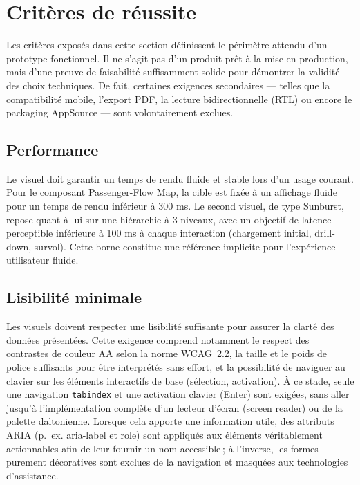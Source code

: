 \section{Critères de réussite}
\label{sec:success-criteria}

Les critères exposés dans cette section définissent le périmètre attendu d’un prototype fonctionnel. Il ne s’agit pas d’un produit prêt à la mise en production, mais d’une preuve de faisabilité suffisamment solide pour démontrer la validité des choix techniques. De fait, certaines exigences secondaires — telles que la compatibilité mobile, l’export PDF, la lecture bidirectionnelle (RTL) ou encore le packaging AppSource — sont volontairement exclues.

\subsection{Performance}  
Le visuel doit garantir un temps de rendu fluide et stable lors d’un usage courant. Pour le composant Passenger-Flow Map, la cible est fixée à un affichage fluide pour un temps de rendu inférieur à 300 ms. Le second visuel, de type Sunburst, repose quant à lui sur une hiérarchie à 3 niveaux, avec un objectif de latence perceptible inférieure à 100 ms à chaque interaction (chargement initial, drill-down, survol). Cette borne constitue une référence implicite pour l’expérience utilisateur fluide.

\subsection{Lisibilité minimale}  
Les visuels doivent respecter une lisibilité suffisante pour assurer la clarté des données présentées. Cette exigence comprend notamment le respect des contrastes de couleur AA selon la norme WCAG~2.2, la taille et le poids de police suffisants pour être interprétés sans effort, et la possibilité de naviguer au clavier sur les éléments interactifs de base (sélection, activation). À ce stade, seule une navigation \texttt{tabindex} et une activation clavier (Enter) sont exigées, sans aller jusqu’à l’implémentation complète d’un lecteur d’écran (screen reader) ou de la palette daltonienne. Lorsque cela apporte une information utile, des attributs ARIA (p.~ex. aria-label et role) sont appliqués aux éléments véritablement actionnables afin de leur fournir un nom accessible ; à l’inverse, les formes purement décoratives sont exclues de la navigation et masquées aux technologies d’assistance.

